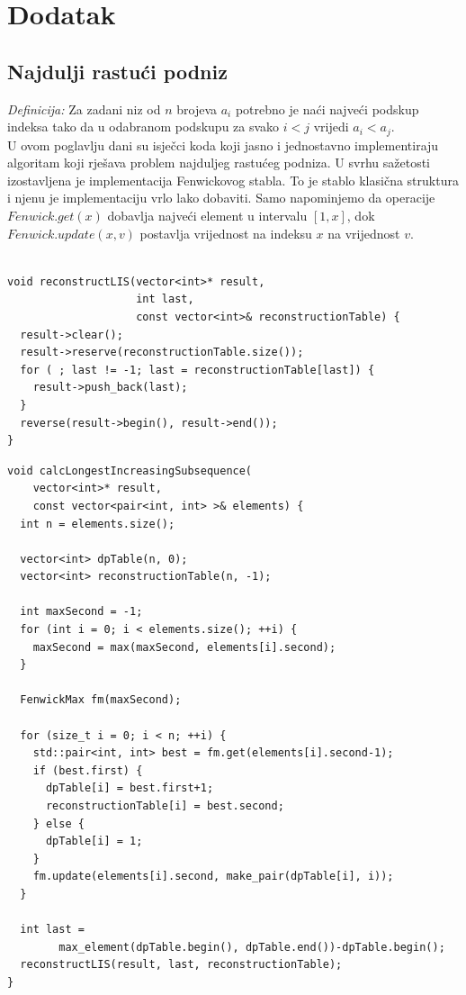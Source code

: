 \documentclass[times, utf8, diplomski]{fer}
\begin{document}
\chapter{Dodatak}

\section{Najdulji rastući podniz\cite{Fredman197529}}
\emph{Definicija:} Za zadani niz od $n$ brojeva $a_i$ potrebno je naći najveći podskup indeksa tako da u odabranom podskupu za svako $i < j$ vrijedi $a_i < a_j$.
\\
U ovom poglavlju dani su isječci koda koji jasno i jednostavno implementiraju algoritam koji rješava problem najduljeg rastućeg podniza. U svrhu sažetosti izostavljena je implementacija Fenwickovog stabla. To je stablo klasična struktura i njenu je implementaciju vrlo lako dobaviti. Samo napominjemo da operacije $Fenwick.get(x)$ dobavlja najveći element u intervalu $[1,x]$, dok $Fenwick.update(x, v)$ postavlja vrijednost na indeksu $x$ na vrijednost $v$.


\begin{algorithm}[H]
\begin{lstlisting}

void reconstructLIS(vector<int>* result,
                    int last,
                    const vector<int>& reconstructionTable) {
  result->clear();
  result->reserve(reconstructionTable.size());
  for ( ; last != -1; last = reconstructionTable[last]) {
    result->push_back(last);
  }
  reverse(result->begin(), result->end());
}

\end{lstlisting}
\end{algorithm}


\begin{algorithm}[H]
\begin{lstlisting}
void calcLongestIncreasingSubsequence(
    vector<int>* result,
    const vector<pair<int, int> >& elements) {
  int n = elements.size();

  vector<int> dpTable(n, 0);
  vector<int> reconstructionTable(n, -1);

  int maxSecond = -1;
  for (int i = 0; i < elements.size(); ++i) {
    maxSecond = max(maxSecond, elements[i].second);
  }

  FenwickMax fm(maxSecond);

  for (size_t i = 0; i < n; ++i) {
    std::pair<int, int> best = fm.get(elements[i].second-1);
    if (best.first) {
      dpTable[i] = best.first+1;
      reconstructionTable[i] = best.second;
    } else {
      dpTable[i] = 1;
    }
    fm.update(elements[i].second, make_pair(dpTable[i], i));
  }

  int last = 
        max_element(dpTable.begin(), dpTable.end())-dpTable.begin();
  reconstructLIS(result, last, reconstructionTable);
}
\end{lstlisting}
\end{algorithm}
\end{document}
